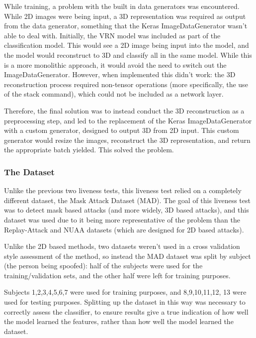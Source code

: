 \documentclass[10pt,a4paper]{article}
\begin{document}
            While training, a problem with the built in data generators was encountered. While 2D images were being input, a 3D representation was required as output from the data generator,
            something that the Keras ImageDataGenerator wasn't able to deal with. Initially, the VRN model was included as part of the classification model. This would see a 2D image being input into the model,
            and the model would reconstruct to 3D and classify all in the same model. While this is a more monolithic approach, it would avoid the need to switch out the ImageDataGenerator. However,
            when implemented this didn't work: the 3D reconstruction process required non-tensor operations (more specifically, the use of the stack command), which could not be included as a network layer.

            Therefore, the final solution was to instead conduct the 3D reconstruction as a preprocessing step, and led to the replacement of the Keras ImageDataGenerator with a custom generator, designed to output 3D from 2D input.
            This custom generator would resize the images, reconstruct the 3D representation, and return the appropriate batch yielded. This solved the problem.

        \subsubsection{The Dataset}
            Unlike the previous two liveness tests, this liveness test relied on a completely different dataset, the Mask Attack Dataset (MAD). \cite{3DMadDataset}
            The goal of this liveness test was to detect mask based attacks (and more widely, 3D based attacks), and this dataset was used due to it being more representative of the problem
            than the Replay-Attack and NUAA datasets (which are designed for 2D based attacks).

            Unlike the 2D based methods, two datasets weren't used in a cross validation style assessment of the method, so instead the MAD dataset was split by subject (the person being spoofed):
            half of the subjects were used for the training/validation sets, and the other half were left for training purposes.

            Subjects 1,2,3,4,5,6,7 were used for training purposes, and 8,9,10,11,12, 13 were used for testing purposes. Splitting up the dataset in this way was necessary to correctly assess the classifier,
            to ensure results give a true indication of how well the model learned the features, rather than how well the model learned the dataset.
\end{document}
